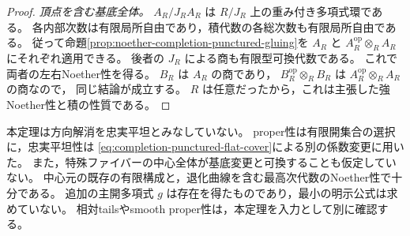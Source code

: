 \begin{proof}
\emph{頂点を含む基底全体。}
$A_R/J_RA_R$ は $R/J_R$ 上の重み付き多項式環である。
各内部次数は有限局所自由であり，積代数の各総次数も有限局所自由である。
従って命題\ref{prop:noether-completion-punctured-gluing}を
$A_R$ と $A_R^{\mathrm{op}}\otimes_R A_R$ にそれぞれ適用できる。
後者の $J_R$ による商も有限型可換代数である。
これで両者の左右Noether性を得る。
$B_R$ は $A_R$ の商であり，
$B_R^{\mathrm{op}}\otimes_R B_R$ は $A_R^{\mathrm{op}}\otimes_R A_R$ の商なので，
同じ結論が成立する。
$R$ は任意だったから，これは主張した強Noether性と積の性質である。
\end{proof}

\begin{remark}\label{rem:noether-descent-scope}
本定理は方向解消を忠実平坦とみなしていない。
proper性は有限開集合の選択に，忠実平坦性は
\eqref{eq:completion-punctured-flat-cover}による別の係数変更に用いた。
また，特殊ファイバーの中心全体が基底変更と可換することも仮定していない。
中心元の既存の有限構成と，退化曲線を含む最高次代数のNoether性で十分である。
追加の主開多項式 $g$ は存在を得たものであり，最小の明示公式は求めていない。
相対tailsやsmooth proper性は，本定理を入力として別に確認する。
\end{remark}
